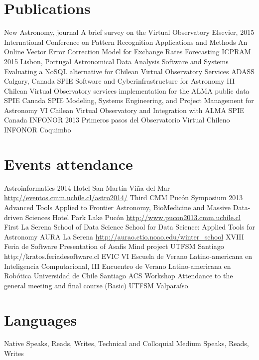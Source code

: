 \documentclass[11pt,a4paper]{moderncv}
\begin{document}
\section{Publications}
	{New Astronomy, journal}
	{A brief survey on the Virtual Observatory}
	{Elsevier, 2015}
	{}
	{}
	{International Conference on Pattern Recognition Applications and Methods}
	{An Online Vector Error Correction Model for Exchange Rates Forecasting}
	{ICPRAM 2015}
	{Lisbon, Portugal}
	{}
	{Astronomical Data Analysis Software and Systems }
	{Evaluating a NoSQL alternative for Chilean Virtual Observatory Services}
	{ADASS}
	{Calgary, Canada}
	{}
	{SPIE Software and Cyberinfrastructure for Astronomy III}
	{Chilean Virtual Observatory services implementation for the ALMA public data}
	{SPIE}
	{Canada}
	{}
	{SPIE Modeling, Systems Engineering, and Project Management for Astronomy VI}
	{Chilean Virtual Observatory and Integration with ALMA}
	{SPIE}
	{Canada}
	{}
	{INFONOR 2013}
	{Primeros pasos del Observatorio Virtual Chileno}
	{INFONOR}
	{Coquimbo}
	{}

\section{Events attendance}
	{Astroinformatics 2014}
	{}
	{Hotel San Martín}
	{Viña del Mar}
	{\url{http://eventos.cmm.uchile.cl/astro2014/}}
	{Third CMM Pucón Symposium 2013}
	{Advanced Tools Applied to Frontier Astronomy, BioMedicine and Massive Data-driven Sciences}
	{Hotel Park Lake}
	{Pucón}
	{\url{http://www.pucon2013.cmm.uchile.cl}}
	{First La Serena School of Data Science}
	{School for Data Science: Applied Tools for Astronomy}
	{AURA}
	{La Serena}
	{\url{http://aurao.ctio.noao.edu/winter_school}}
	{XVIII Feria de Software}
	{Presentation of Asafis Mind project}
	{UTFSM}
	{Santiago}
	{http://kratos.feriadesoftware.cl}
	{EVIC}
	{VI Escuela de Verano Latino-americana en Inteligencia Computacional, III Encuentro de Verano Latino-americana en Robótica}
	{Universidad de Chile}
	{Santiago}
	{}
	{ACS Workshop}
	{Attendance to the general meeting and final course (Basic)}
	{UTFSM}
	{Valparaíso}
	{}


\section{Languages}
	{Native}
	{Speaks, Reads, Writes, Technical and Colloquial}
	{Medium}
	{Speaks, Reads, Writes}
\end{document}
